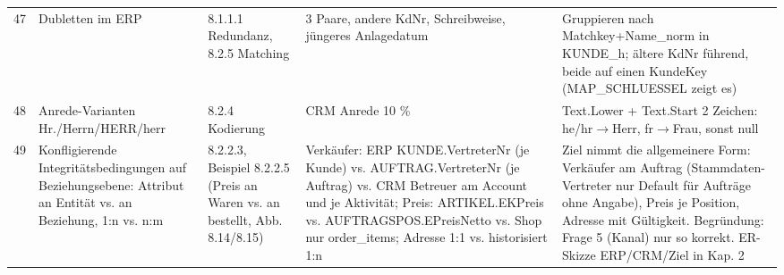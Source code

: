 \begin{landscape}
\begin{small}
\begin{longtable}{@{}r p{3.4cm} p{2.6cm} p{5.2cm} p{7.4cm}@{}}
47 & Dubletten im ERP & 8.1.1.1 Redundanz, 8.2.5 Matching & 3 Paare, andere KdNr, Schreibweise, jüngeres Anlagedatum & Gruppieren nach Matchkey+Name\_norm in KUNDE\_h; ältere KdNr führend, beide auf einen KundeKey (MAP\_SCHLUESSEL zeigt es)\\[2pt]
48 & Anrede-Varianten Hr./Herrn/HERR/herr & 8.2.4 Kodierung & CRM Anrede 10 \% & Text.Lower + Text.Start 2 Zeichen: \grqq{}he\grqq{}/\grqq{}hr\grqq{}$\rightarrow$Herr, \grqq{}fr\grqq{}$\rightarrow$Frau, sonst null\\[2pt]
49 & Konfligierende Integritätsbedingungen auf Beziehungsebene: Attribut an Entität vs. an Beziehung, 1:n vs. n:m & 8.2.2.3, Beispiel 8.2.2.5 (Preis an Waren vs. an bestellt, Abb. 8.14/8.15) & Verkäufer: ERP KUNDE.VertreterNr (je Kunde) vs. AUFTRAG.VertreterNr (je Auftrag) vs. CRM Betreuer am Account und je Aktivität; Preis: ARTIKEL.EKPreis vs. AUFTRAGSPOS.EPreisNetto vs. Shop nur order\_items; Adresse 1:1 vs. historisiert 1:n & Ziel nimmt die allgemeinere Form: Verkäufer am Auftrag (Stammdaten-Vertreter nur Default für Aufträge ohne Angabe), Preis je Position, Adresse mit Gültigkeit. Begründung: Frage 5 (Kanal) nur so korrekt. ER-Skizze ERP/CRM/Ziel in Kap. 2\\[2pt]
\end{longtable}
\end{small}
\end{landscape}
